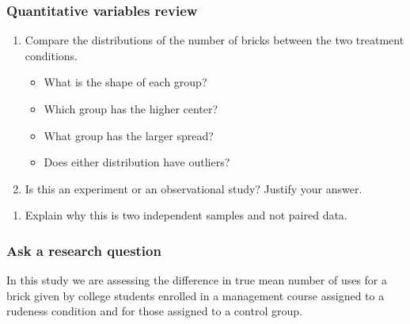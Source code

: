 \documentclass[
]{report}
\providecommand{\tightlist}{%
  \setlength{\itemsep}{0pt}\setlength{\parskip}{0pt}}
\begin{document}
\subsubsection*{Quantitative variables review}\label{quantitative-variables-review}

\begin{enumerate}
\def\labelenumi{\arabic{enumi}.}
\item
  Compare the distributions of the number of bricks between the two treatment conditions.

  \begin{itemize}
  \item
    What is the shape of each group?
    \vspace{0.3in}
  \item
    Which group has the higher center?
    \vspace{0.3in}
  \item
    What group has the larger spread?
    \vspace{0.3in}
  \item
    Does either distribution have outliers?
    \vspace{.3in}
  \end{itemize}
\item
  Is this an experiment or an observational study? Justify your answer.
\end{enumerate}

\vspace{1in}

\begin{enumerate}
\def\labelenumi{\arabic{enumi}.}
\setcounter{enumi}{2}
\tightlist
\item
  Explain why this is two independent samples and not paired data.
  \vspace{1in}
\end{enumerate}

\subsubsection*{Ask a research question}\label{ask-a-research-question-6}

In this study we are assessing the difference in true mean number of uses for a brick given by college students enrolled in a management course assigned to a rudeness condition and for those assigned to a control group.
\end{document}
